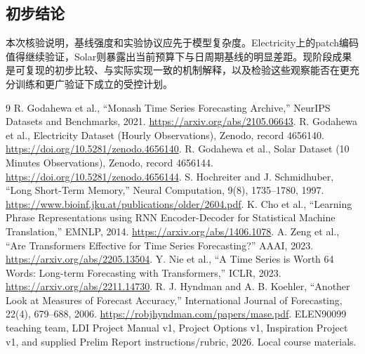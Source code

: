 \documentclass[10pt,a4paper]{article}
\begin{document}
\subsection{初步结论}
本次核验说明，基线强度和实验协议应先于模型复杂度。Electricity上的patch编码值得继续验证，Solar则暴露出当前预算下与日周期基线的明显差距。现阶段成果是可复现的初步比较、与实际实现一致的机制解释，以及检验这些观察能否在更充分训练和更广验证下成立的受控计划。
\clearpage
\begin{thebibliography}{9}\small
{} R. Godahewa et al., ``Monash Time Series Forecasting Archive,'' NeurIPS Datasets and Benchmarks, 2021. \url{https://arxiv.org/abs/2105.06643}.
 R. Godahewa et al., Electricity Dataset (Hourly Observations), Zenodo, record 4656140. \url{https://doi.org/10.5281/zenodo.4656140}.
 R. Godahewa et al., Solar Dataset (10 Minutes Observations), Zenodo, record 4656144. \url{https://doi.org/10.5281/zenodo.4656144}.
 S. Hochreiter and J. Schmidhuber, ``Long Short-Term Memory,'' Neural Computation, 9(8), 1735--1780, 1997. \url{https://www.bioinf.jku.at/publications/older/2604.pdf}.
 K. Cho et al., ``Learning Phrase Representations using RNN Encoder-Decoder for Statistical Machine Translation,'' EMNLP, 2014. \url{https://arxiv.org/abs/1406.1078}.
 A. Zeng et al., ``Are Transformers Effective for Time Series Forecasting?'' AAAI, 2023. \url{https://arxiv.org/abs/2205.13504}.
 Y. Nie et al., ``A Time Series is Worth 64 Words: Long-term Forecasting with Transformers,'' ICLR, 2023. \url{https://arxiv.org/abs/2211.14730}.
 R. J. Hyndman and A. B. Koehler, ``Another Look at Measures of Forecast Accuracy,'' International Journal of Forecasting, 22(4), 679--688, 2006. \url{https://robjhyndman.com/papers/mase.pdf}.
 ELEN90099 teaching team, LDI Project Manual v1, Project Options v1, Inspiration Project v1, and supplied Prelim Report instructions/rubric, 2026. Local course materials.
\end{thebibliography}
\end{document}
